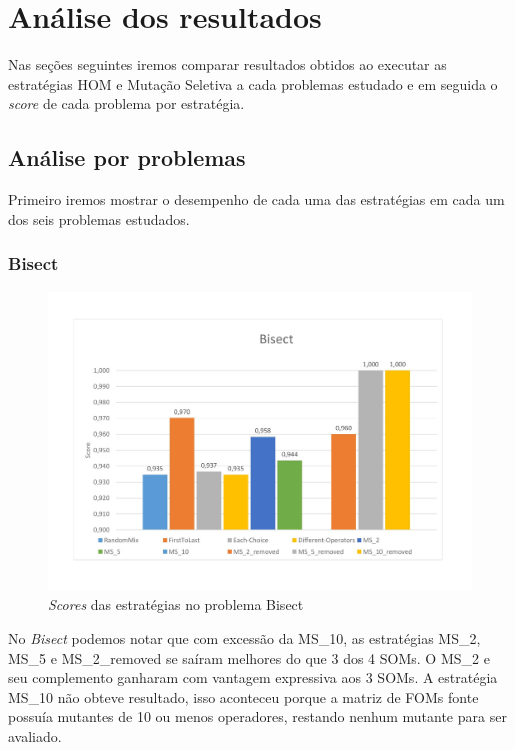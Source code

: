 \section{Análise dos resultados}
Nas seções seguintes iremos comparar resultados obtidos ao executar as estratégias HOM e Mutação Seletiva a cada problemas estudado e em seguida o \textit{score} de cada problema por estratégia.

\subsection{Análise por problemas}
Primeiro iremos mostrar o desempenho de cada uma das estratégias em cada um dos seis problemas estudados.

\subsubsection{Bisect}
\begin{figure}[H]
\includegraphics[width=1\textwidth]{graficos/problems/bisect.jpg}
\caption{\textit{Scores} das estratégias no problema Bisect}
\label{fig:bisect}
\end{figure}
No \textit{Bisect} podemos notar que com excessão da MS\_10, as estratégias MS\_2, MS\_5 e MS\_2\_removed se saíram melhores do que 3 dos 4 SOMs. O MS\_2 e seu complemento ganharam com vantagem expressiva aos 3 SOMs.
A estratégia MS\_10 não obteve resultado, isso aconteceu porque a matriz de FOMs fonte possuía mutantes de 10 ou menos operadores, restando nenhum mutante para ser avaliado.

